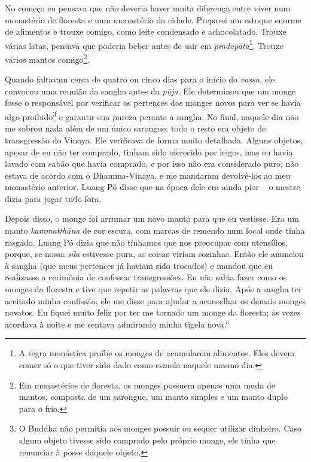 No começo eu pensava que não deveria haver muita diferença entre viver
num monastério de floresta e num monastério da cidade. Preparei um
estoque enorme de alimentos e trouxe comigo, como leite condensado e
achocolatado. Trouxe várias latas, pensava que poderia beber antes de
sair em \emph{pindapāta}\footnote{A regra monástica proíbe os monges de
  acumularem alimentos. Eles devem comer só o que tiver sido dado como
  esmola naquele mesmo dia.}. Trouxe vários mantos comigo\footnote{Em
  monastérios de floresta, os monges possuem apenas uma muda de mantos,
  composta de um sarongue, um manto simples e um manto duplo para o
  frio.}.

Quando faltavam cerca de quatro ou cinco dias para o início do
\emph{vassa,} ele convocou uma reunião da sangha antes da \emph{pūja}.
Ele determinou que um monge fosse o responsável por verificar os
pertences dos monges novos para ver se havia algo proibido\footnote{O
  Buddha não permitia aos monges possuir ou sequer utilizar dinheiro.
  Caso algum objeto tivesse sido comprado pelo próprio monge, ele tinha
  que renunciar à posse daquele objeto.} e garantir sua pureza perante a
sangha. No final, naquele dia não me sobrou nada além de um único
sarongue: todo o resto era objeto de transgressão do Vinaya. Ele
verificava de forma muito detalhada. Alguns objetos, apesar de eu não
ter comprado, tinham sido oferecido por leigos, mas eu havia lavado com
sabão que havia comprado, e por isso não era considerado puro, não
estava de acordo com o Dhamma-Vinaya, e me mandaram devolvê-los ao meu
monastério anterior. Luang Pó disse que na época dele era ainda pior --
o mestre dizia para jogar tudo fora.

Depois disso, o monge foi arrumar um novo manto para que eu vestisse.
Era um manto \emph{kammatthāna} de cor escura, com marcas de remendo num
local onde tinha rasgado. Luang Pó dizia que não tínhamos que nos
preocupar com utensílios, porque, se nossa \emph{sīla} estivesse pura,
as coisas viriam sozinhas. Então ele anunciou à sangha (que meus
pertences já haviam sido trocados) e mandou que eu realizasse a
cerimônia de confessar transgressões. Eu não sabia fazer como os monges
da floresta e tive que repetir as palavras que ele dizia. Após a sangha
ter aceitado minha confissão, ele me disse para ajudar a aconselhar os
demais monges novatos. Eu fiquei muito feliz por ter me tornado um monge
da floresta; às vezes acordava à noite e me sentava admirando minha
tigela nova.''

